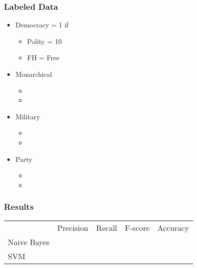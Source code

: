 \documentclass{beamer}
\begin{document}
\begin{frame}
\frametitle{Labeled Data}

\begin{itemize}
	\item Democracy = 1 if
	\begin{itemize}
		\item Polity = 10
		\item FH = Free
	\end{itemize}
	\item Monarchical
	\begin{itemize}
		\item
		\item
	\end{itemize}
	\item Military
		\begin{itemize}
		\item
		\item
	\end{itemize}
	\item Party
		\begin{itemize}
		\item
		\item
	\end{itemize}
\end{itemize}

\end{frame}

\begin{itemize}
\frametitle{Results}

\begin{table}[ht]
\centering
\begin{tabular}{lcccc}
\hline\hline
~ & Precision & Recall & F-score & Accuracy \\
Naive Bayes &  &  &  &  & \\
SVM &  &  &  &  & \\
\hline\hline
\end{tabular}
\end{table}

\end{itemize}

\end{document}
